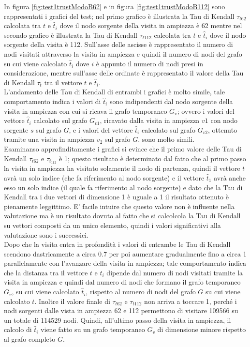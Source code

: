 In figura \ref{fig:test1trustModoB62}  e in figura \ref{fig:test1trustModoB112} sono rappresentati i grafici del test;  nel primo grafico è illustrata la Tau di Kendall \(\tau_{t62}\) calcolata tra \(t\) e \(\hat{t}_i\) dove il nodo sorgente della visita in ampiezza è 62 mentre nel secondo grafico è illustrata la Tau di Kendall \(\tau_{t112}\) calcolata tra \(t\) e \(\hat{t}_i\) dove il nodo sorgente della visita è 112. Sull'asse delle ascisse è rappresentato il numero di nodi  visitati attraverso la visita in ampiezza e quindi il numero di nodi del grafo su cui viene calcolato \(\hat{t}_i\) dove \(i\) è appunto il numero di nodi presi in considerazione, mentre sull'asse delle ordinate è rappresentato il valore della Tau di Kendall \(\tau_t\) tra il vettore \(t\) e \(\hat{t}_i\).\\
L'andamento delle Tau di Kendall di entrambi i grafici è molto simile, tale comportamento indica i valori di \(\hat{t}_i\) sono indipendenti dal nodo sorgente della visita in ampiezza  con cui si ricava il grafo temporaneo \(G_v\); ovvero i valori del vettore \(\hat{t}_i\) calcolato sul grafo \(G_{v1}\), ricavato dalla visita in ampiezza \(v1\) con nodo sorgente \(s\) sul grafo \(G\), e i valori del vettore \(\hat{t}_i\) calcolato sul grafo \(G_{v2}\), ottenuto tramite una visita in ampiezza \(v_2\) sul grafo \(G\), sono molto simili.\\
Esaminanso approfinditamente i grafici si evince che il primo  valore delle Tau di Kendall \(\tau_{t62}\) e \(\tau_{t_112}\) è 1; questo risultato è determinato dal fatto che al primo passo la visita in ampiezza ha visitato solamente il nodo di partenza, quindi  il vettore \(t\) avrà un solo indice (che fa riferimento al nodo sorgente) e il vettore \(\hat{t}_1\) avrà anche esso un solo indice (il quale fa riferimento al nodo sorgente) e dato che  la Tau di Kendall tra i due vettori di dimensione 1 è uguale a 1 il risultato ottenuto è pienamente leggittimo. E' facile intuire che questo valore non è influente nella valutazione ma è un risultato dovuto al fatto che si calcolcola la Tau di Kendall su vettori composti da un unico elemento, quindi i valori significativi alla valutazione sono i successici.\\
Dopo che la visita entra in profondità i valori di entrambe le Tau di Kendall  scendono dastricamente a circa 0.7 per poi aumentare gradualmente fino a circa 1 parallelamente con l'avanzare della visita in ampiezza; tale comportamento indica che la distanza tra il vettore \(t\) e \(\hat{t}_i\) dipende dal numero di nodi visitati tramite la visita in ampiezza e quindi dal numero di nodi che formano il grafo temporaneo \(G_v\), su cui viene calcolato \(\hat{t}_i\), rispetto al numero di nodi del grafo \(G\) su cui viene calcolato \(t\). Inoltre il valore finale di \(\tau_{t62}\) e \(\tau_{t112}\) non arriva a toccare 1, perché i nodi sorgenti dalle vista in ampiezza 62 e 112 permettono di visitare 109566 su un totale di 114529 nodi. Quindi, all'ultimo passo della visita in ampiezza,  il calcolo di \(\hat{t}_i\) viene fatto su un grafo temporaneo \(G_v\) di dimensione minore rispetto al grafo completo \(G\).


